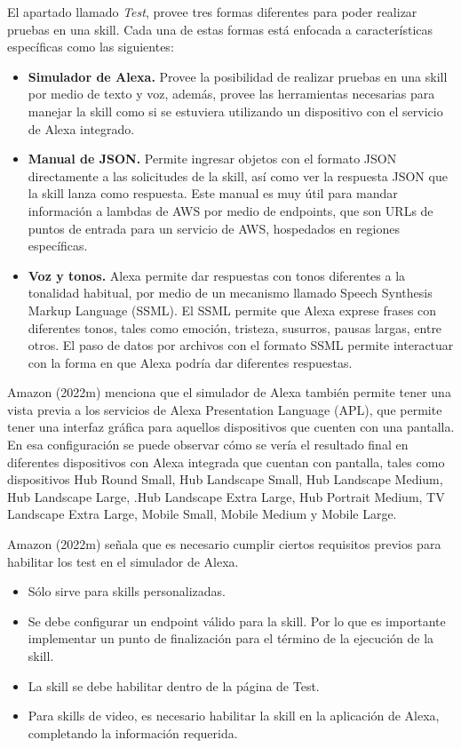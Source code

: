 El apartado llamado \textit{Test}, provee tres formas diferentes para poder realizar pruebas en una skill. Cada una de estas formas está enfocada a características específicas como las siguientes:

\begin{itemize}
  \item \textbf{Simulador de Alexa.} Provee la posibilidad de realizar pruebas en una skill por medio de texto y voz, además, provee las herramientas necesarias para manejar la skill como si se estuviera utilizando un dispositivo con el servicio de Alexa integrado.
  \item \textbf{Manual de JSON.} Permite ingresar objetos con el formato JSON directamente a las solicitudes de la skill, así como ver la respuesta JSON que la skill lanza como respuesta. Este manual es muy útil para mandar información a lambdas de AWS por medio de endpoints, que son URLs de puntos de entrada para un servicio de AWS, hospedados en regiones específicas.
  \item \textbf{Voz y tonos.} Alexa permite dar respuestas con tonos diferentes a la tonalidad habitual, por medio de un mecanismo llamado Speech Synthesis Markup Language (SSML). El SSML permite que Alexa exprese frases con diferentes tonos, tales como emoción, tristeza, susurros, pausas largas, entre otros. El paso de datos por archivos con el formato SSML permite interactuar con la forma en que Alexa podría dar diferentes respuestas.
\end{itemize}

Amazon (2022m) menciona que el simulador de Alexa también permite tener una vista previa a los servicios de Alexa Presentation Language (APL), que permite tener una interfaz gráfica para aquellos dispositivos que cuenten con una pantalla. En esa configuración se puede observar cómo se vería el resultado final en diferentes dispositivos con Alexa integrada que cuentan con pantalla, tales como dispositivos Hub Round Small, Hub Landscape Small, Hub Landscape Medium, Hub Landscape Large, .Hub Landscape Extra Large, Hub Portrait Medium, TV Landscape Extra Large, Mobile Small, Mobile Medium y Mobile Large.

Amazon (2022m) señala que es necesario cumplir ciertos requisitos previos para habilitar los test en el simulador de Alexa.

\begin{itemize}
  \item Sólo sirve para skills personalizadas.
  \item Se debe configurar un endpoint válido para la skill. Por lo que es importante implementar un punto de finalización para el término de la ejecución de la skill.
  \item La skill se debe habilitar dentro de la página de Test.
  \item Para skills de video, es necesario habilitar la skill en la aplicación de Alexa, completando la información requerida.
\end{itemize}


